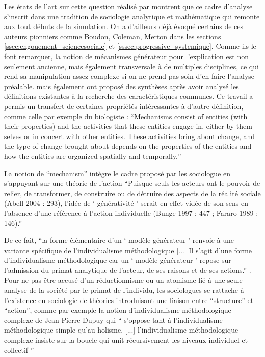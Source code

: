 Les états de l'art sur cette question réalisé par \textcites{Manzo2005,Manzo2007, Hedstrom1998, Berger2010} montrent que ce cadre d'analyse s'inscrit dans une tradition de sociologie analytique et mathématique qui remonte aux tout débuts de la simulation. On a d'ailleurs déjà évoqué certains de ces auteurs pionniers comme Boudon, Coleman, Merton dans les sections \ref{ssec:engouement_sciencesociale} et \ref{sssec:progressive_systemique}. Comme ils le font remarquer, la notion de mécanismes générateur pour l'explication est non seulement ancienne, mais également transversale à de multiples disciplines, ce qui rend sa manipulation assez complexe si on ne prend pas soin d'en faire l'analyse préalable. \textcite{Hedstrom2010} mais également \textcite{Manzo2005} ont proposé des synthèses après avoir analysé les définitions existantes à la recherche des caractéristiques communes. Ce travail a permis un transfert de certaines propriétés intéressantes à d'autre définition, comme celle par exemple du biologiste \textcite{Machamer2000} : \foreignquote{english}{Mechanisms consist of entities (with their properties) and the activities that these entities engage in, either by themselves or in concert with other entities. These activities bring about change, and the type of change brought about depends on the properties of the entities and how the entities are organized spatially and temporally.}

La notion de \enquote{mechanism} intègre le cadre proposé par les sociologue en s'appuyant sur une théorie de l'action \enquote{Puisque seuls les acteurs ont le pouvoir de relier, de transformer, de construire ou de détruire des aspects de la réalité sociale (Abell 2004 : 293), l’idée de  \enquote{ générativité } serait en effet vidée de son sens en l’absence d’une référence à l’action individuelle (Bunge 1997 : 447 ; Fararo 1989 : 146).}

De ce fait, \enquote{la forme élémentaire d’un \enquote{ modèle générateur } renvoie à une variante spécifique de l’individualisme méthodologique [...] Il s’agit d’une forme d’individualisme méthodologique car un  \enquote{ modèle générateur } repose sur l’admission du primat analytique de l’acteur, de ses raisons et de ses actions.} \autocite{Manzo2007}. Pour ne pas être accusé d'un réductionnisme ou un atomisme lié à une seule analyse de la société par le primat de l'individu, les sociologues se rattache  à l'existence en sociologie de théories introduisant une liaison entre \enquote{structure} et \enquote{action}, comme par exemple la notion d'individualisme méthodologique complexe de Jean-Pierre Dupuy \autocite{Dupuy2004} qui \enquote{ s’oppose tant à l’individualisme méthodologique simple qu’au holisme. [...] l’individualisme méthodologique complexe insiste sur la boucle qui unit récursivement les niveaux individuel et collectif } \autocite[9]{Manzo2007}

